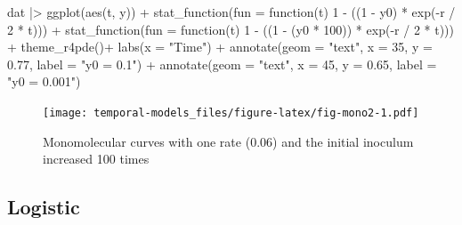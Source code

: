 \documentclass[
  letterpaper,
]{book}
\newenvironment{Shaded}{\begin{snugshade}}{\end{snugshade}}
\newcommand{\AttributeTok}[1]{\textcolor[rgb]{0.40,0.45,0.13}{#1}}
\newcommand{\ControlFlowTok}[1]{\textcolor[rgb]{0.00,0.23,0.31}{#1}}
\newcommand{\DecValTok}[1]{\textcolor[rgb]{0.68,0.00,0.00}{#1}}
\newcommand{\FloatTok}[1]{\textcolor[rgb]{0.68,0.00,0.00}{#1}}
\newcommand{\FunctionTok}[1]{\textcolor[rgb]{0.28,0.35,0.67}{#1}}
\newcommand{\NormalTok}[1]{\textcolor[rgb]{0.00,0.23,0.31}{#1}}
\newcommand{\SpecialCharTok}[1]{\textcolor[rgb]{0.37,0.37,0.37}{#1}}
\newcommand{\StringTok}[1]{\textcolor[rgb]{0.13,0.47,0.30}{#1}}
\begin{document}
\begin{Shaded}
\begin{Highlighting}[]
\NormalTok{dat }\SpecialCharTok{|\textgreater{}}
  \FunctionTok{ggplot}\NormalTok{(}\FunctionTok{aes}\NormalTok{(t, y)) }\SpecialCharTok{+}
  \FunctionTok{stat\_function}\NormalTok{(}\AttributeTok{fun =} \ControlFlowTok{function}\NormalTok{(t) }\DecValTok{1} \SpecialCharTok{{-}}\NormalTok{ ((}\DecValTok{1} \SpecialCharTok{{-}}\NormalTok{ y0) }\SpecialCharTok{*} \FunctionTok{exp}\NormalTok{(}\SpecialCharTok{{-}}\NormalTok{r }\SpecialCharTok{/} \DecValTok{2} \SpecialCharTok{*}\NormalTok{ t))) }\SpecialCharTok{+}
  \FunctionTok{stat\_function}\NormalTok{(}\AttributeTok{fun =} \ControlFlowTok{function}\NormalTok{(t) }\DecValTok{1} \SpecialCharTok{{-}}\NormalTok{ ((}\DecValTok{1} \SpecialCharTok{{-}}\NormalTok{ (y0 }\SpecialCharTok{*} \DecValTok{100}\NormalTok{)) }\SpecialCharTok{*} \FunctionTok{exp}\NormalTok{(}\SpecialCharTok{{-}}\NormalTok{r }\SpecialCharTok{/} \DecValTok{2} \SpecialCharTok{*}\NormalTok{ t))) }\SpecialCharTok{+}
  \FunctionTok{theme\_r4pde}\NormalTok{()}\SpecialCharTok{+}
  \FunctionTok{labs}\NormalTok{(}\AttributeTok{x =} \StringTok{"Time"}\NormalTok{) }\SpecialCharTok{+}
  \FunctionTok{annotate}\NormalTok{(}\AttributeTok{geom =} \StringTok{"text"}\NormalTok{, }\AttributeTok{x =} \DecValTok{35}\NormalTok{, }\AttributeTok{y =} \FloatTok{0.77}\NormalTok{, }\AttributeTok{label =} \StringTok{"y0 = 0.1"}\NormalTok{) }\SpecialCharTok{+}
  \FunctionTok{annotate}\NormalTok{(}\AttributeTok{geom =} \StringTok{"text"}\NormalTok{, }\AttributeTok{x =} \DecValTok{45}\NormalTok{, }\AttributeTok{y =} \FloatTok{0.65}\NormalTok{, }\AttributeTok{label =} \StringTok{"y0 = 0.001"}\NormalTok{)}
\end{Highlighting}
\end{Shaded}

\begin{figure}

{\centering \texttt{[image: temporal-models\_files/figure-latex/fig-mono2-1.pdf]}

}

\caption{\label{fig-mono2}Monomolecular curves with one rate (0.06) and
the initial inoculum increased 100 times}

\end{figure}

\hypertarget{logistic}{%
\subsection{Logistic}\label{logistic}}
\end{document}
